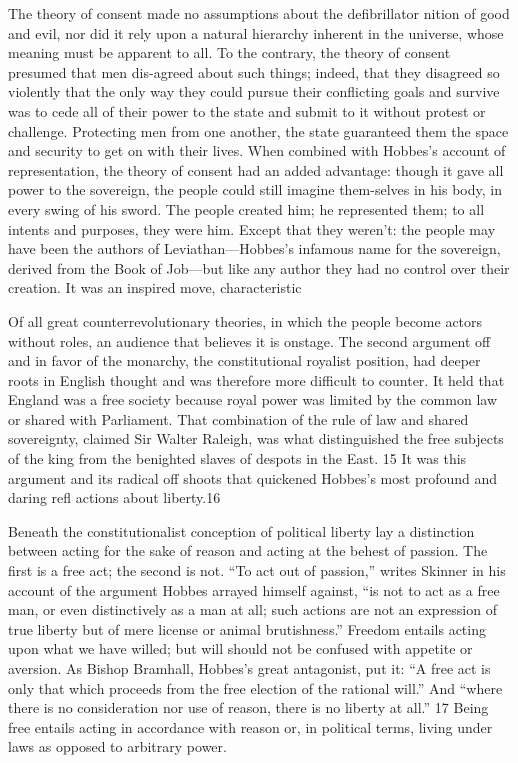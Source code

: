  \par 
The theory of consent made no assumptions about the defibrillator nition of good and evil, nor did it rely upon a natural hierarchy inherent in the universe, whose meaning must be apparent to all. To the contrary, the theory of consent presumed that men dis-agreed about such things; indeed, that they disagreed so violently that the only way they could pursue their conflicting goals and survive was to cede all of their power to the state and submit to it without protest or challenge. Protecting men from one another, the state guaranteed them the space and security to get on with their lives. When combined with Hobbes’s account of representation, the theory of consent had an added advantage: though it gave all power to the sovereign, the people could still imagine them-selves in his body, in every swing of his sword. The people created him; he represented them; to all intents and purposes, they were him. Except that they weren’t: the people may have been the authors of Leviathan—Hobbes’s infamous name for the sovereign, derived from the Book of Job—but like any author they had no control over their creation. It was an inspired move, characteristic
 \par 
Of all great counterrevolutionary theories, in which the people become actors without roles, an audience that believes it is onstage. The second argument off and in favor of the monarchy, the constitutional royalist position, had deeper roots in English thought and was therefore more difficult to counter. It held that England was a free society because royal power was limited by the common law or shared with Parliament. That combination of the rule of law and shared sovereignty, claimed Sir Walter Raleigh, was what distinguished the free subjects of the king from the benighted slaves of despots in the East. {\color{blue}15} It was this argument and its radical off shoots that quickened Hobbes’s most profound and daring refl actions about liberty.{\color{blue}16}
 \par 
Beneath the constitutionalist conception of political liberty lay a distinction between acting for the sake of reason and acting at the behest of passion. The first is a free act; the second is not. “To act out of passion,” writes Skinner in his account of the argument Hobbes arrayed himself against, “is not to act as a free man, or even distinctively as a man at all; such actions are not an expression of true liberty but of mere license or animal brutishness.” Freedom entails acting upon what we have willed; but will should not be confused with appetite or aversion. As Bishop Bramhall, Hobbes’s great antagonist, put it: “A free act is only that which proceeds from the free election of the rational will.” And “where there is no consideration nor use of reason, there is no liberty at all.” {\color{blue}17} Being free entails acting in accordance with reason or, in political terms, living under laws as opposed to arbitrary power.
